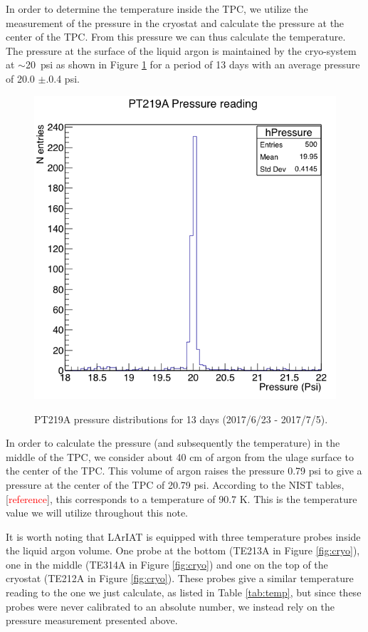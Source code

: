 In order to determine the temperature inside the TPC, we utilize the measurement of the pressure in the cryostat and calculate the pressure at the center of the TPC. From this pressure we can thus calculate the temperature. The pressure at the surface of the liquid argon is maintained by the cryo-system at $\sim$20~psi as shown in Figure \ref{fig:pressure} for a period of 13 days with an average pressure of 20.0 $\pm$.0.4 psi.

\begin{figure}[htb]
\centering
\includegraphics[scale=0.45]{./images/Pressure.png}\\
\caption{PT219A pressure distributions for 13 days (2017/6/23 - 2017/7/5).}
\label{fig:pressure}
\end{figure}

In order to calculate the pressure (and subsequently the temperature) in the middle of the TPC, we consider about 40 cm of argon from the ulage surface to the center of the TPC. This volume of argon raises the pressure 0.79 psi to give a pressure at the center of the TPC of 20.79 psi. According to the NIST tables, [\textcolor{red}{reference}], this corresponds to a temperature of 90.7 K. This is the temperature value we will utilize throughout this note.

It is worth noting that LArIAT is equipped with three temperature probes inside the liquid argon volume. One probe at the bottom (TE213A in Figure \ref{fig:cryo}), one in the middle (TE314A in Figure \ref{fig:cryo}) and one on the top of the cryostat (TE212A in Figure \ref{fig:cryo}). These probes give a similar temperature reading to the one we just calculate, as listed in Table \ref{tab:temp}, but since these probes were never calibrated to an absolute number, we instead rely on the pressure measurement presented above.


